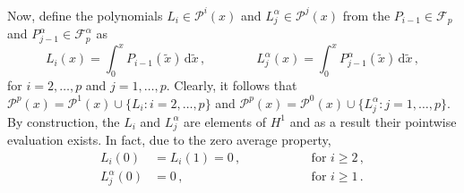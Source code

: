 Now, define the polynomials $L_{i}\in\mathcal{P}^{i}(x)$ and $L_{j}^\alpha\in\mathcal{P}^{j}(x)$ from the $P_{i-1}\in\mathcal{F}_p$ and $P_{j-1}^\alpha\in\mathcal{F}_p^\alpha$ as
\begin{equation}
    L_{i}(x)=\int_0^x P_{i-1}(\tilde{x})\,\mathrm{d}\tilde{x}\,,\qquad\qquad 
    	L_{j}^\alpha(x)=\int_0^x P_{j-1}^\alpha(\tilde{x})\,\mathrm{d}\tilde{x}\,,
\end{equation}
for $i=2,\ldots,p$ and $j=1,\ldots,p$.
Clearly, it follows that $\mathcal{P}^{p}(x)=\mathcal{P}^1(x)\cup\{L_i:i=2,\ldots,p\}$ and $\mathcal{P}^{p}(x)=\mathcal{P}^0(x)\cup\{L_j^\alpha:j=1,\ldots,p\}$.
By construction, the $L_i$ and $L_j^\alpha$ are elements of $H^1$ and as a result their pointwise evaluation exists. 
In fact, due to the zero average property, 
\begin{equation}
	\begin{alignedat}{3}
		L_i(0)&=L_i(1)=0\,,\qquad\qquad&&\text{for }i\geq2\,,\\
		L_j^\alpha(0)&=0\,,\qquad\qquad&&\text{for }i\geq1\,.
	\end{alignedat}
	\label{eq:AppLiLjVanishingProperties}
\end{equation}



